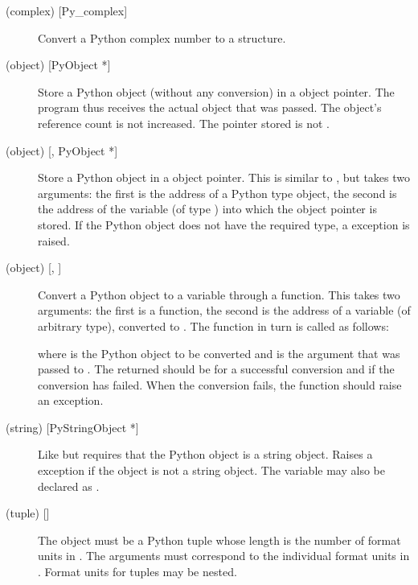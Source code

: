 \documentclass{manual}
\begin{document}
\begin{description}
\item[ (complex) {[Py_complex]}]
Convert a Python complex number to a \C{}  structure.

\item[ (object) {[PyObject *]}]
Store a Python object (without any conversion) in a \C{} object pointer.
The \C{} program thus receives the actual object that was passed.  The
object's reference count is not increased.  The pointer stored is not
\NULL{}.

\item[ (object) {[, PyObject *]}]
Store a Python object in a \C{} object pointer.  This is similar to
, but takes two \C{} arguments: the first is the address of a
Python type object, the second is the address of the \C{} variable (of
type ) into which the object pointer is stored.
If the Python object does not have the required type, a
 exception is raised.

\item[ (object) {[, ]}]
Convert a Python object to a \C{} variable through a 
function.  This takes two arguments: the first is a function, the
second is the address of a \C{} variable (of arbitrary type), converted
to .  The  function in turn is called as
follows:


where  is the Python object to be converted and
 is the  argument that was passed to
.  The returned  should be
 for a successful conversion and  if the conversion
has failed.  When the conversion fails, the  function
should raise an exception.

\item[ (string) {[PyStringObject *]}]
Like  but requires that the Python object is a string object.
Raises a  exception if the object is not a string
object.  The \C{} variable may also be declared as .

\item[ (tuple) {[]}]
The object must be a Python tuple whose length is the number of format
units in .  The \C{} arguments must correspond to the
individual format units in .  Format units for tuples may
be nested.

\end{description}
\end{document}
